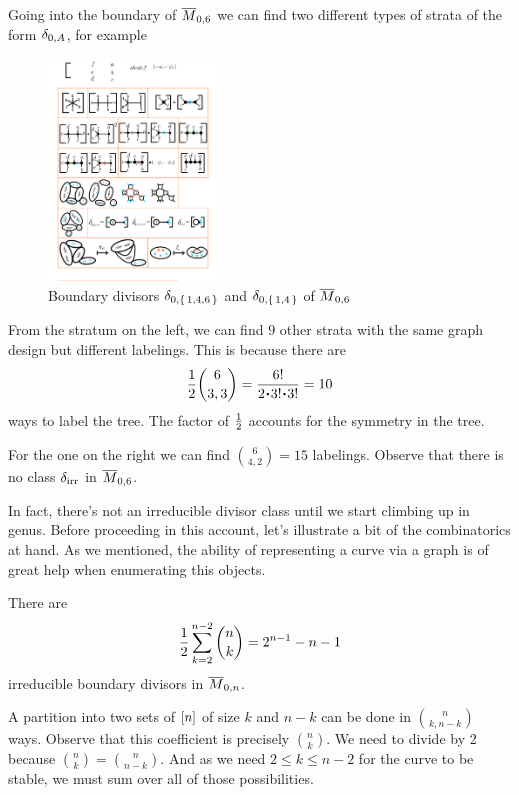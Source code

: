 \documentclass[12pt]{memoir}
\begin{document}
\begin{Ex}
    Going into the boundary of $\overline M_{0,6}$ we can find two different types of strata of the form $\delta_{0,A}$, for example
    \begin{figure}[h!]
        \centering
        \includegraphics[width=0.4\textwidth, trim= 5.12cm 20.75cm 8.93cm 3.9cm,clip]{../figs/FigsDNnotability1.pdf}
        \caption{Boundary divisors $\delta_{0,\{\,1,4,6\,\}}$ and $\delta_{0,\{\,1,4\,\}}$ of $\overline{M}_{0,6}$}
        \label{fig:boundary-strata-M06c1}
    \end{figure} 
    From the stratum on the left, we can find $9$ other strata with the same graph design but different labelings. This is because there are 
    $$\half\binom{6}{3,3}=\frac{6!}{2\.3!\.3!}=10$$
    ways to label the tree. The factor of $\half$ accounts for the symmetry in the tree.\par
    For the one on the right we can find $\binom{6}{4,2}=15$ labelings. Observe that there is no class $\delta_{\text{irr}}$ in $\overline M_{0,6}$. 
\end{Ex}

In fact, there's not an irreducible divisor class until we start climbing up in genus. Before proceeding in this account, let's illustrate a bit of the combinatorics at hand. As we mentioned, the ability of representing a curve via a graph is of great help when enumerating this objects.

\begin{Prop}
    There are 
    $$\half\sum_{k=2}^{n-2}\binom{n}{k}=2^{n-1}-n-1$$
    irreducible boundary divisors in $\overline M_{0,n}$.
\end{Prop}

\begin{ptcbp}
    A partition into two sets of $\left\lbrack n\right\rbrack$ of size $k$ and $n-k$ can be done in $\binom{n}{k,n-k}$ ways. Observe that this coefficient is precisely $\binom{n}{k}$. We need to divide by 2 because $\binom{n}{k}=\binom{n}{n-k}$. And as we need $2\leq k\leq n-2$ for the curve to be stable, we must sum over all of those possibilities. 
\end{ptcbp}
\end{document}
